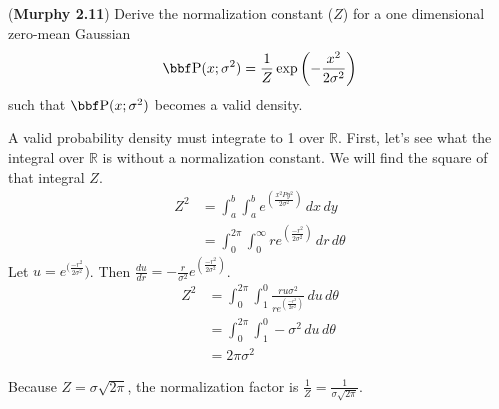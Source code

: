 \documentclass[12pt,letterpaper]{hmcpset}
\begin{document}
\begin{problem}[2]
	(\textbf{Murphy 2.11})
	Derive the normalization constant ($Z$) for a one dimensional
	zero-mean Gaussian
	\[
	\PP(x; \sigma^2) = \frac{1}{Z}\exp\left(-\frac{x^2}{2\sigma^2}\right)
	\]
	such that $\PP(x; \sigma^2)$ becomes a valid density.
\end{problem}
\begin{solution}
	A valid probability density must integrate to 1 over $\mathbb{R}$.
	First, let's see what the integral over $\mathbb{R}$ is without a normalization constant. We will find the square of that integral $Z$.
	\begin{align*}
		Z^2 &= \int_a^b \int_a^b e^{(\frac{x^2 P y^2}{2 \sigma^2})} \, dx \, dy\\
		&= \int_0^{2\pi} \int_0^{\infty} r e^{(\frac{-r^2}{2 \sigma^2})} \, dr \, d\theta
	\end{align*}
	Let $u = e^{(\frac{-r^2}{2 \sigma^2}})$. Then $\frac{du}{dr} = -\frac{r}{\sigma^2} e^{(\frac{-r^2}{2 \sigma^2})}$.
	\begin{align*}
		Z^2 &= \int_0^{2\pi} \int_1^{0} \frac{r u \sigma^2}{r e^{(\frac{-r^2}{2 \sigma^2})}} \, du \, d\theta\\
		&= \int_0^{2\pi} \int_1^{0} -\sigma^2 \, du \, d\theta\\
		&= 2 \pi \sigma^2
	\end{align*}

	Because $Z = \sigma \sqrt{2 \pi}$, the normalization factor is $\frac{1}{Z} = \frac{1}{\sigma \sqrt{2 \pi}}$.

	\vfill
\end{solution}
\newpage
\end{document}
